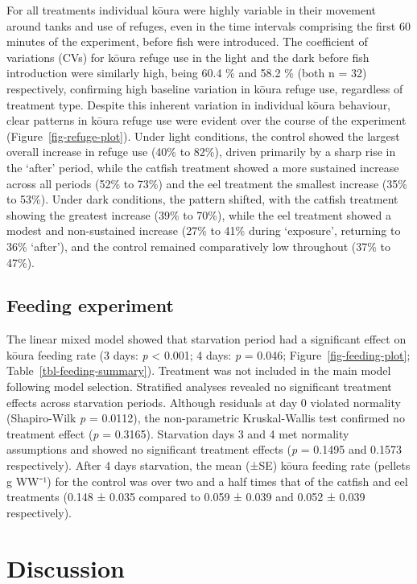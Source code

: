 \documentclass[
  12pt,
  a4paper,
  oneside]{scrbook}
\begin{document}
For all treatments individual kōura were highly variable in their
movement around tanks and use of refuges, even in the time intervals
comprising the first 60 minutes of the experiment, before fish were
introduced. The coefficient of variations (CVs) for kōura refuge use in
the light and the dark before fish introduction were similarly high,
being 60.4 \% and 58.2 \% (both n = 32) respectively, confirming high
baseline variation in kōura refuge use, regardless of treatment type.
Despite this inherent variation in individual kōura behaviour, clear
patterns in kōura refuge use were evident over the course of the
experiment (Figure~\ref{fig-refuge-plot}). Under light conditions, the
control showed the largest overall increase in refuge use (40\% to
82\%), driven primarily by a sharp rise in the `after' period, while the
catfish treatment showed a more sustained increase across all periods
(52\% to 73\%) and the eel treatment the smallest increase (35\% to
53\%). Under dark conditions, the pattern shifted, with the catfish
treatment showing the greatest increase (39\% to 70\%), while the eel
treatment showed a modest and non-sustained increase (27\% to 41\%
during `exposure', returning to 36\% `after'), and the control remained
comparatively low throughout (37\% to 47\%).

\subsection{Feeding experiment}\label{feeding-experiment-1}

The linear mixed model showed that starvation period had a significant
effect on kōura feeding rate (3 days: \emph{p} \textless{} 0.001; 4
days: \emph{p} = 0.046; Figure~\ref{fig-feeding-plot};
Table~\ref{tbl-feeding-summary}). Treatment was not included in the main
model following model selection. Stratified analyses revealed no
significant treatment effects across starvation periods. Although
residuals at day 0 violated normality (Shapiro-Wilk \emph{p} = 0.0112),
the non-parametric Kruskal-Wallis test confirmed no treatment effect
(\emph{p} = 0.3165). Starvation days 3 and 4 met normality assumptions
and showed no significant treatment effects (\emph{p} = 0.1495 and
0.1573 respectively). After 4 days starvation, the mean (±SE) kōura
feeding rate (pellets g WW⁻¹) for the control was over two and a half
times that of the catfish and eel treatments (0.148 ± 0.035 compared to
0.059 ± 0.039 and 0.052 ± 0.039 respectively).

\section{Discussion}\label{discussion}
\end{document}
